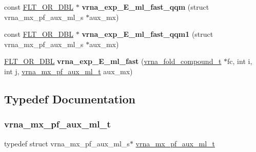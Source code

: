 \begin{DoxyCompactItemize}
\item 
\mbox{\label{group__eval__loops__mb_gadb5ec8ebfe72254dace68f3693376643}} 
const \hyperlink{group__data__structures_ga31125aeace516926bf7f251f759b6126}{F\+L\+T\+\_\+\+O\+R\+\_\+\+D\+BL} $\ast$ {\bfseries vrna\+\_\+exp\+\_\+\+E\+\_\+ml\+\_\+fast\+\_\+qqm} (struct vrna\+\_\+mx\+\_\+pf\+\_\+aux\+\_\+ml\+\_\+s $\ast$aux\+\_\+mx)
\item 
\mbox{\label{group__eval__loops__mb_ga38ecb773ebbc084d563339919152bcf7}} 
const \hyperlink{group__data__structures_ga31125aeace516926bf7f251f759b6126}{F\+L\+T\+\_\+\+O\+R\+\_\+\+D\+BL} $\ast$ {\bfseries vrna\+\_\+exp\+\_\+\+E\+\_\+ml\+\_\+fast\+\_\+qqm1} (struct vrna\+\_\+mx\+\_\+pf\+\_\+aux\+\_\+ml\+\_\+s $\ast$aux\+\_\+mx)
\item 
\mbox{\label{group__eval__loops__mb_gaf688fa4e6331403debb9802f3fda8bf4}} 
\hyperlink{group__data__structures_ga31125aeace516926bf7f251f759b6126}{F\+L\+T\+\_\+\+O\+R\+\_\+\+D\+BL} {\bfseries vrna\+\_\+exp\+\_\+\+E\+\_\+ml\+\_\+fast} (\hyperlink{group__fold__compound_ga1b0cef17fd40466cef5968eaeeff6166}{vrna\+\_\+fold\+\_\+compound\+\_\+t} $\ast$fc, int i, int j, \hyperlink{group__eval__loops__mb_ga39a8cc1385dcb542a60a9393cde6a1e3}{vrna\+\_\+mx\+\_\+pf\+\_\+aux\+\_\+ml\+\_\+t} aux\+\_\+mx)
\end{DoxyCompactItemize}


\subsection{Typedef Documentation}
\mbox{\label{group__eval__loops__mb_ga39a8cc1385dcb542a60a9393cde6a1e3}} 
\subsubsection{\texorpdfstring{vrna\+\_\+mx\+\_\+pf\+\_\+aux\+\_\+ml\+\_\+t}{vrna\_mx\_pf\_aux\_ml\_t}}
{\footnotesize\ttfamily typedef struct vrna\+\_\+mx\+\_\+pf\+\_\+aux\+\_\+ml\+\_\+s$\ast$ \hyperlink{group__eval__loops__mb_ga39a8cc1385dcb542a60a9393cde6a1e3}{vrna\+\_\+mx\+\_\+pf\+\_\+aux\+\_\+ml\+\_\+t}}




